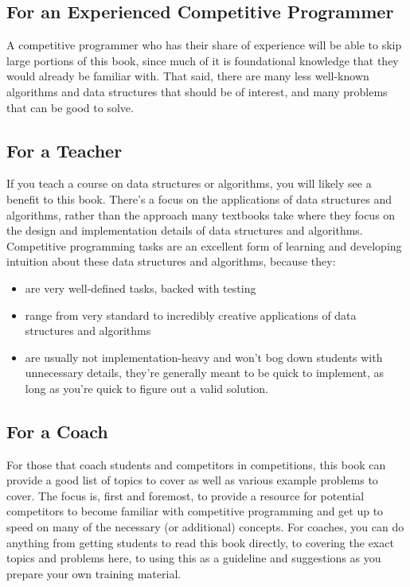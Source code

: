 \subsection*{For an Experienced Competitive Programmer}

A competitive programmer who has their share of experience will be able to skip large portions of this book, since much of it is foundational knowledge that they would already be familiar with. That said, there are many less well-known algorithms and data structures that should be of interest, and many problems that can be good to solve.

\subsection*{For a Teacher}

If you teach a course on data structures or algorithms, you will likely see a benefit to this book. There's a focus on the applications of data structures and algorithms, rather than the approach many textbooks take where they focus on the design and implementation details of data structures and algorithms. Competitive programming tasks are an excellent form of learning and developing intuition about these data structures and algorithms, because they:
\begin{itemize}
\item are very well-defined tasks, backed with testing
\item range from very standard to incredibly creative applications of data structures and algorithms
\item are usually not implementation-heavy and won't bog down students with unnecessary details, they're generally meant to be quick to implement, as long as you're quick to figure out a valid solution.
\end{itemize}

\subsection*{For a Coach}

For those that coach students and competitors in competitions, this book can provide a good list of topics to cover as well as various example problems to cover. The focus is, first and foremost, to provide a resource for potential competitors to become familiar with competitive programming and get up to speed on many of the necessary (or additional) concepts. For coaches, you can do anything from getting students to read this book directly, to covering the exact topics and problems here, to using this as a guideline and suggestions as you prepare your own training material.